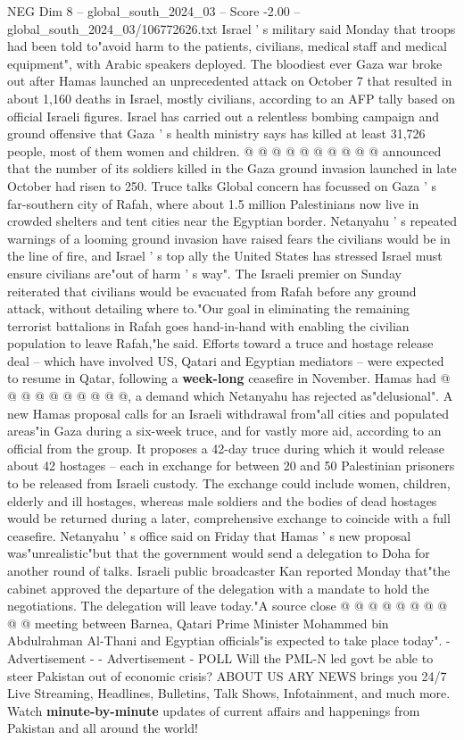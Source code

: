 \begin{textsample}{NEG Dim 8 – global\_south\_2024\_03 – Score -2.00 – global\_south\_2024\_03/106772626.txt}
Israel ' s military said Monday that troops had been told to"avoid harm to the patients, civilians, medical staff and medical equipment", with Arabic speakers deployed.
The bloodiest ever Gaza war broke out after Hamas launched an unprecedented attack on October 7 that resulted in about 1,160 deaths in Israel, mostly civilians, according to an AFP tally based on official Israeli figures.
Israel has carried out a relentless bombing campaign and ground offensive that Gaza ' s health ministry says has killed at least 31,726 people, most of them women and children. @ @ @ @ @ @ @ @ @ @ announced that the number of its soldiers killed in the Gaza ground invasion launched in late October had risen to 250.
Truce talks Global concern has focussed on Gaza ' s far-southern city of Rafah, where about 1.5 million Palestinians now live in crowded shelters and tent cities near the Egyptian border.
Netanyahu ' s repeated warnings of a looming ground invasion have raised fears the civilians would be in the line of fire, and Israel ' s top ally the United States has stressed Israel must ensure civilians are"out of harm ' s way".
The Israeli premier on Sunday reiterated that civilians would be evacuated from Rafah before any ground attack, without detailing where to."Our goal in eliminating the remaining terrorist battalions in Rafah goes hand-in-hand with enabling the civilian population to leave Rafah,"he said.
Efforts toward a truce and hostage release deal -- which have involved US, Qatari and Egyptian mediators -- were expected to resume in Qatar, following a \textbf{week-long} ceasefire in November.
Hamas had @ @ @ @ @ @ @ @ @ @, a demand which Netanyahu has rejected as"delusional".
A new Hamas proposal calls for an Israeli withdrawal from"all cities and populated areas"in Gaza during a six-week truce, and for vastly more aid, according to an official from the group.
It proposes a 42-day truce during which it would release about 42 hostages -- each in exchange for between 20 and 50 Palestinian prisoners to be released from Israeli custody.
The exchange could include women, children, elderly and ill hostages, whereas male soldiers and the bodies of dead hostages would be returned during a later, comprehensive exchange to coincide with a full ceasefire.
Netanyahu ' s office said on Friday that Hamas ' s new proposal was"unrealistic"but that the government would send a delegation to Doha for another round of talks.
Israeli public broadcaster Kan reported Monday that"the cabinet approved the departure of the delegation with a mandate to hold the negotiations.
The delegation will leave today."A source close @ @ @ @ @ @ @ @ @ @ meeting between Barnea, Qatari Prime Minister Mohammed bin Abdulrahman Al-Thani and Egyptian officials"is expected to take place today". - Advertisement - - Advertisement - POLL Will the PML-N led govt be able to steer Pakistan out of economic crisis?
ABOUT US ARY NEWS brings you 24/7 Live Streaming, Headlines, Bulletins, Talk Shows, Infotainment, and much more.
Watch \textbf{minute-by-minute} updates of current affairs and happenings from Pakistan and all around the world!

\end{textsample}
